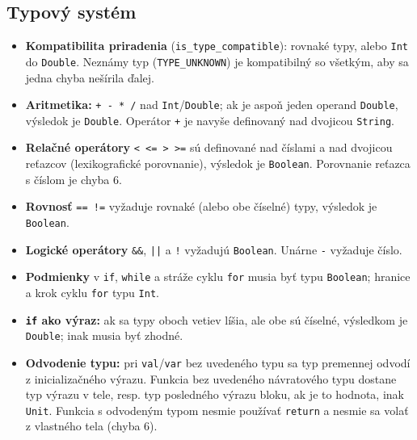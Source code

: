 \subsection{Typový systém}
\begin{itemize}
    \item \textbf{Kompatibilita priradenia} (\texttt{is\_type\_compatible}): rovnaké typy, alebo \texttt{Int} do \texttt{Double}. Neznámy typ (\texttt{TYPE\_UNKNOWN}) je kompatibilný so všetkým, aby sa jedna chyba nešírila ďalej.
    \item \textbf{Aritmetika:} \texttt{+ - * /} nad \texttt{Int}/\texttt{Double}; ak je aspoň jeden operand \texttt{Double}, výsledok je \texttt{Double}. Operátor \texttt{+} je navyše definovaný nad dvojicou \texttt{String}.
    \item \textbf{Relačné operátory} \texttt{< <= > >=} sú definované nad číslami a nad dvojicou reťazcov (lexikografické porovnanie), výsledok je \texttt{Boolean}. Porovnanie reťazca s číslom je chyba 6.
    \item \textbf{Rovnosť} \texttt{== !=} vyžaduje rovnaké (alebo obe číselné) typy, výsledok je \texttt{Boolean}.
    \item \textbf{Logické operátory} \texttt{\&\&}, \texttt{||} a \texttt{!} vyžadujú \texttt{Boolean}. Unárne \texttt{-} vyžaduje číslo.
    \item \textbf{Podmienky} v \texttt{if}, \texttt{while} a stráže cyklu \texttt{for} musia byť typu \texttt{Boolean}; hranice a krok cyklu \texttt{for} typu \texttt{Int}.
    \item \textbf{\texttt{if} ako výraz:} ak sa typy oboch vetiev líšia, ale obe sú číselné, výsledkom je \texttt{Double}; inak musia byť zhodné.
    \item \textbf{Odvodenie typu:} pri \texttt{val}/\texttt{var} bez uvedeného typu sa typ premennej odvodí z inicializačného výrazu. Funkcia bez uvedeného návratového typu dostane typ výrazu v tele, resp. typ posledného výrazu bloku, ak je to hodnota, inak \texttt{Unit}. Funkcia s odvodeným typom nesmie používať \texttt{return} a nesmie sa volať z vlastného tela (chyba 6).
\end{itemize}


